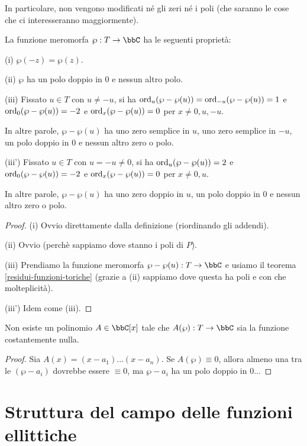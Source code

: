 In particolare, non vengono modificati né gli zeri né i poli (che saranno le cose che ci interesseranno maggiormente).


\begin{proposizione}
La funzione meromorfa $\wp:T\rar\bbC$ ha le seguenti proprietà:

(i) $\wp(-z)=\wp(z)$.

(ii) $\wp$ ha un polo doppio in $0$ e nessun altro polo.

(iii) Fissato $u\in T$ con $u\not=-u$, si ha $\text{ord}_u(\wp-\wp(u))=\text{ord}_{-u}(\wp-\wp(u))=1$ e $\text{ord}_0(\wp-\wp(u))=-2$ e $\text{ord}_x(\wp-\wp(u))=0$ per $x\not=0,u,-u$.

In altre parole, $\wp-\wp(u)$ ha uno zero semplice in $u$, uno zero semplice in $-u$, un polo doppio in $0$ e nessun altro zero o polo.

(iii') Fissato $u\in T$ con $u=-u\not=0$, si ha $\text{ord}_u(\wp-\wp(u))=2$ e $\text{ord}_0(\wp-\wp(u))=-2$ e $\text{ord}_x(\wp-\wp(u))=0$ per $x\not=0,u$.

In altre parole, $\wp-\wp(u)$ ha uno zero doppio in $u$, un polo doppio in $0$ e nessun altro zero o polo.
\end{proposizione}
\begin{proof}
(i) Ovvio direttamente dalla definizione (riordinando gli addendi).

(ii) Ovvio (perchè sappiamo dove stanno i poli di $P$).

(iii) Prendiamo la funzione meromorfa $\wp-\wp(u):T\rar\bbC$ e usiamo il teorema \ref{residui-funzioni-toriche} (grazie a (ii) sappiamo dove questa ha poli e con che molteplicità).

(iii') Idem come (iii).
\end{proof}


\begin{teorema}
Non esiste un polinomio $A\in\bbC[x]$ tale che $A(\wp):T\rar\bbC$ sia la funzione costantemente nulla.
\end{teorema}
\begin{proof}
Sia $A(x)=(x-a_1)...(x-a_n)$. Se $A(\wp)\equiv0$, allora almeno una tra le $(\wp-a_i)$ dovrebbe essere $\equiv0$, ma $\wp-a_i$ ha un polo doppio in $0$...
\end{proof}

\section{Struttura del campo delle funzioni ellittiche}


